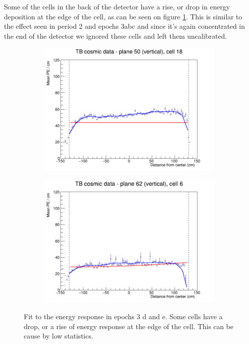 \documentclass[12pt,a4paper]{article}
\begin{document}
Some of the cells in the back of the detector have a rise, or drop in energy deposition at the edge of the cell, as can be seen on figure \ref{figAttenfitResultsEpoch3de_CellEdges}. This is similar to the effect seen in period 2 and epochs 3abc and since it's again concentrated in the end of the detector we ignored these cells and left them uncalibrated.

\begin{figure}[h]
  \begin{subfigure}{0.5\textwidth}
    \includegraphics[width=\linewidth]{RelativeCalibrationResults/ep3de_050_018.png}
  \end{subfigure}
  \begin{subfigure}{0.5\textwidth}
    \includegraphics[width=\linewidth]{RelativeCalibrationResults/ep3de_062_006.png}
  \end{subfigure}
  \caption{Fit to the energy response in epochs 3 d and e. Some cells have a drop, or a rise of energy response at the edge of the cell. This can be cause by low statistics.}
  \label{figAttenfitResultsEpoch3de_CellEdges}
\end{figure}
\end{document}
